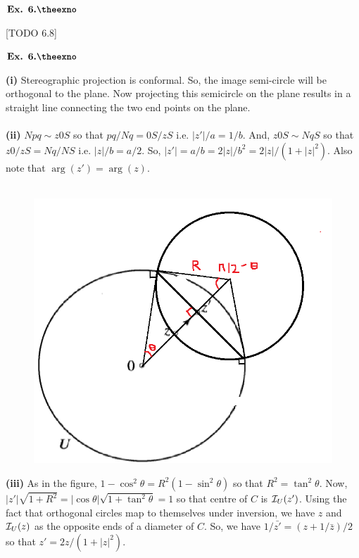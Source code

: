 \documentclass{article}
\def\tf{\textbf}
\def\mc{\ensuremath\mathcal}
\newcounter{exno}
\begin{document}
${\textbf{Ex. 6.\theexno}}$
\addtocounter{exno}{1}

[TODO 6.8]

\vspace{0.2in}

${\textbf{Ex. 6.\theexno}}$
\addtocounter{exno}{1}

\tf{(i)} Stereographic projection is conformal. So, the image semi-circle will be orthogonal to the plane. Now projecting this semicircle on the plane results in a straight line connecting the two end points on the plane.\\~\\

\tf{(ii)} $Npq \sim z0S$ so that $pq/Nq = 0S/zS$ i.e. $|z'|/a = 1/b$. And, $z0S \sim NqS$ so that $z0/zS = Nq/NS$ i.e. $|z|/b = a/2$. So, $|z'| = a/b = 2|z|/b^2 = 2|z|/(1+|z|^2)$. Also note that $\arg(z')=\arg(z)$.\\~\\

\begin{figure}[h!]
    \centering
    \includegraphics[scale=0.7]{6_9}
    \label{6_9}
\end{figure}

\tf{(iii)} As in the figure, $1-\cos^2\theta = R^2(1-\sin^2\theta)$ so that $R^2 = \tan^2\theta$. Now, $|z'|\sqrt{1+R^2} = |\cos\theta|\sqrt{1+\tan^2\theta} = 1$ so that centre of $C$ is $\mc{I}_U(z')$. Using the fact that orthogonal circles map to themselves under inversion, we have $z$ and $\mc{I}_{U}(z)$ as the opposite ends of a diameter of $C$. So, we have $1/\bar{z'} = (z+1/\bar{z})/2$ so that $z' = 2z/(1+|z|^2)$.
\end{document}
